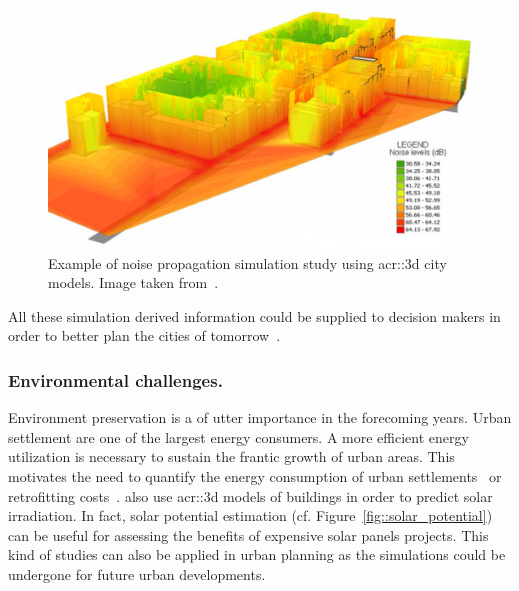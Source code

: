             \begin{figure}[htb]
                \centering
                \includegraphics[width=\textwidth]{images/introduction/3d_model_applications/noise_simulation}
                \caption[
                    Example of noise propagation simulation study using \acrshort*{acr::3d} city models.
                ]{
                    \label{fig::noise_propogation}
                    Example of noise propagation simulation study using \gls{acr::3d} city models.
                    Image taken from~\parencite{kurakula2007gis}.
                }
            \end{figure}

            All these simulation derived information could be supplied to decision makers in order to better plan the cities of tomorrow~\parencite{huck2019urban}.

        \subsubsection{Environmental challenges.}
            Environment preservation is a of utter importance in the forecoming years.
            Urban settlement are one of the largest energy consumers.
            A more efficient energy utilization is necessary to sustain the frantic growth of urban areas.
            This motivates the need to quantify the energy consumption of urban settlements~\parencite{wate20153d} or retrofitting costs~\parencite{previtali2014automatic}.
            \textcite{biljecki2015propagation} also use \gls{acr::3d} models of buildings in order to predict solar irradiation.
            In fact, solar potential estimation (cf. Figure~\ref{fig::solar_potential}) can be useful for assessing the benefits of expensive solar panels projects.
            This kind of studies can also be applied in urban planning as the simulations could be undergone for future urban developments.

